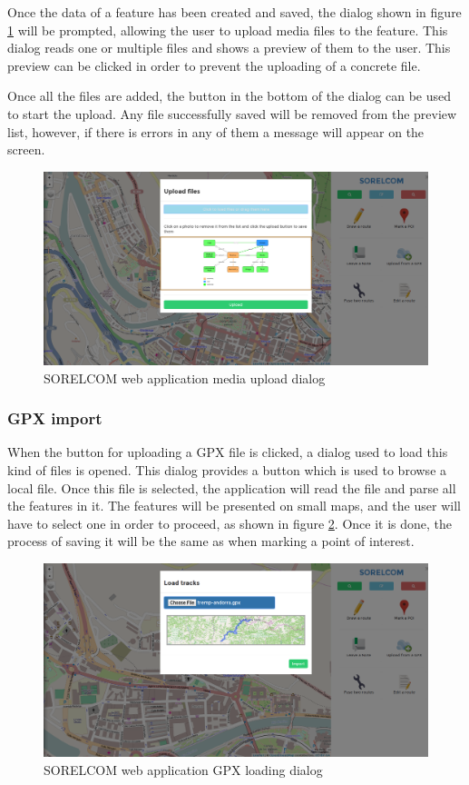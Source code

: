 Once the data of a feature has been created and saved, the dialog shown in figure \ref{fig:upload} will be prompted, allowing the user to upload media files to the feature. This dialog reads one or multiple files and shows a preview of them to the user. This preview can be clicked in order to prevent the uploading of a concrete file.

Once all the files are added, the button in the bottom of the dialog can be used to start the upload. Any file successfully saved will be removed from the preview list, however, if there is errors in any of them a message will appear on the screen.

\begin{figure}[ht]
  \centering
  \includegraphics[width=.75\textwidth]{fig/upload-file}
  \caption{SORELCOM web application media upload dialog}
  \label{fig:upload}
\end{figure}

\subsubsection*{GPX import}

When the button for uploading a GPX file is clicked, a dialog used to load this kind of files is opened. This dialog provides a button which is used to browse a local file. Once this file is selected, the application will read the file and parse all the features in it. The features will be presented on small maps, and the user will have to select one in order to proceed, as shown in figure \ref{fig:gpx-import}. Once it is done, the process of saving it will be the same as when marking a point of interest.

\begin{figure}[ht]
  \centering
  \includegraphics[width=.75\textwidth]{fig/trail-import-select}
  \caption{SORELCOM web application GPX loading dialog}
  \label{fig:gpx-import}
\end{figure}

